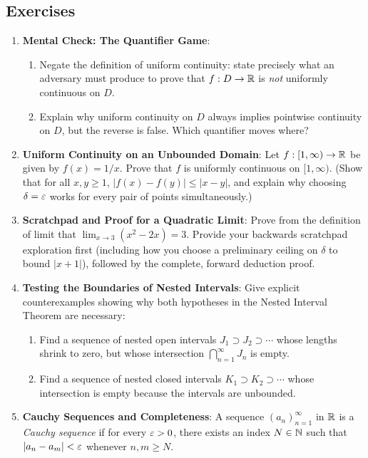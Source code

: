 \subsection{Exercises}

\begin{enumerate}
  \item \textbf{Mental Check: The Quantifier Game}:
  \begin{enumerate}
    \item Negate the definition of uniform continuity: state precisely what an adversary must produce to prove that $f: D \to \mathbb{R}$ is \emph{not} uniformly continuous on $D$.
    \item Explain why uniform continuity on $D$ always implies pointwise continuity on $D$, but the reverse is false. Which quantifier moves where?
  \end{enumerate}
  \item \textbf{Uniform Continuity on an Unbounded Domain}:
  Let $f: [1, \infty) \to \mathbb{R}$ be given by $f(x) = 1/x$. Prove that $f$ is uniformly continuous on $[1, \infty)$. (Show that for all $x, y \ge 1$, $|f(x) - f(y)| \le |x - y|$, and explain why choosing $\delta = \varepsilon$ works for every pair of points simultaneously.)
  \item \textbf{Scratchpad and Proof for a Quadratic Limit}:
  Prove from the definition of limit that $\lim_{x \to 3} (x^2 - 2x) = 3$. Provide your backwards scratchpad exploration first (including how you choose a preliminary ceiling on $\delta$ to bound $|x + 1|$), followed by the complete, forward deduction proof.
  \item \textbf{Testing the Boundaries of Nested Intervals}:
  Give explicit counterexamples showing why both hypotheses in the Nested Interval Theorem are necessary:
  \begin{enumerate}
    \item Find a sequence of nested open intervals $J_1 \supset J_2 \supset \cdots$ whose lengths shrink to zero, but whose intersection $\bigcap_{n=1}^\infty J_n$ is empty.
    \item Find a sequence of nested closed intervals $K_1 \supset K_2 \supset \cdots$ whose intersection is empty because the intervals are unbounded.
  \end{enumerate}
  \item \textbf{Cauchy Sequences and Completeness}:
  A sequence $(a_n)_{n=1}^\infty$ in $\mathbb{R}$ is a \emph{Cauchy sequence} if for every $\varepsilon > 0$, there exists an index $N \in \mathbb{N}$ such that $|a_n - a_m| < \varepsilon$ whenever $n, m \ge N$.

\end{enumerate}
